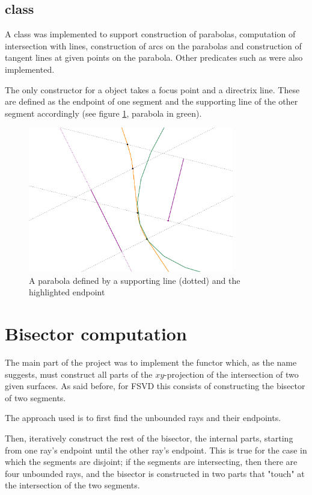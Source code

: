 \documentclass[11pt,a4paper,english]{article}
\begin{document}
	\subsection{ class}
	A  class was implemented to support construction of parabolas, computation of intersection with lines, construction of arcs on the parabolas and construction of tangent lines at given points on the parabola. Other predicates such as  were also implemented.\par
	The only constructor for a  object takes a focus point and a directrix line. These are defined as the endpoint of one segment and the supporting line of the other segment accordingly (see figure \ref{fig:parabola}, parabola in green).
	\begin{figure}[h]
    \centering
    \includegraphics[width=0.8\textwidth]{parabola}
    \caption{A parabola defined by a supporting line (dotted) and the highlighted endpoint \label{fig:parabola}}
	\end{figure}
	
	

	\section{Bisector computation}
	The main part of the project was to implement the functor  which, as the name suggests, must construct all parts of the \(xy\)-projection of the intersection of two given surfaces. As said before, for FSVD this consists of constructing the bisector of two segments.\par
	The approach used is to first find the unbounded rays and their endpoints.\par
	Then, iteratively construct the rest of the bisector, the internal parts, starting from one ray's endpoint until the other ray's endpoint.
	This is true for the case in which the segments are disjoint; if the segments are intersecting, then there are four unbounded rays, and the bisector is constructed in two parts that "touch" at the intersection of the two segments.\ppar
	
\end{document}
